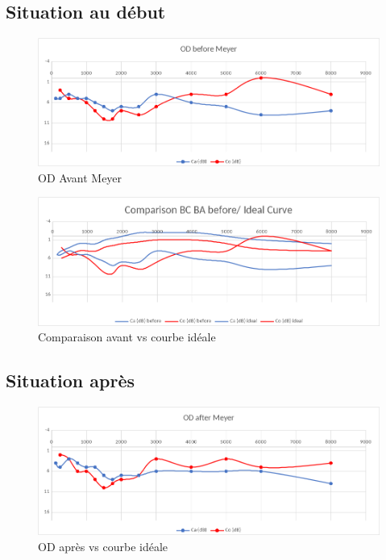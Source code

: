 \begin{enumerate}
 	\subsection{Situation au début}
 	
 	\lipsum[1]
 	
 	\begin{figure}[tbh]
 		\centering
 		\includegraphics[width=0.7\linewidth]{images/clinique/od_before_meyer.png}
 		\caption{OD Avant Meyer}
 		\label{fig:odbeforemeyer}
 	\end{figure}
 	
 	\lipsum[1]
 	
 	
 	
 	
 	\begin{figure}
 		\centering
 		\includegraphics[width=0.7\linewidth]{images/clinique/comparison_bc_ba_before_vs_ideal_curve_meyer.png}
 		\caption[Avant vs courbe idéale]{Comparaison avant vs courbe idéale}
 		\label{fig:comparisonbcbabeforevsidealcurvemeyer}
 	\end{figure}
 	
 	
 	\subsection{Situation après}
 	\lipsum[1]
 	\begin{figure}[h]
 		\centering
 		\includegraphics[width=0.7\linewidth]{images/clinique/od_after_meyer.png}
 		\caption{OD après vs courbe idéale}
 		\label{fig:odaftermeyer}
 	\end{figure}
 

\end{enumerate}
